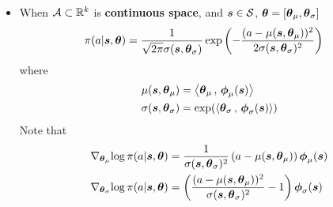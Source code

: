 \documentclass[11pt]{article}
\begin{document}
\begin{itemize}
\begin{itemize}
\begin{itemize}
\item When ${\mathcal A} \subset {\mathbb R}^{k}$ is \textbf{continuous space},  and $\boldsymbol{s} \in {\mathcal S}$, $\boldsymbol{\theta} = [\boldsymbol{\theta}_{\mu}, \boldsymbol{\theta}_{\sigma}]$
\begin{align}
\pi(a |\boldsymbol{s}, \boldsymbol{\theta}) &= \frac{1}{\sqrt{2\pi}\sigma(\boldsymbol{s}, \boldsymbol{\theta}_{\sigma})}\exp\left(-\frac{(a - \mu(\boldsymbol{s}, \boldsymbol{\theta}_{\mu}))^2}{2\sigma(\boldsymbol{s}, \boldsymbol{\theta}_{\sigma})^2}\right)
 \label{eqn: normal_policy}
\end{align} where 
\begin{align*}
\mu(\boldsymbol{s}, \boldsymbol{\theta}_{\mu}) &= \left\langle \boldsymbol{\theta}_{\mu}\,,\, \boldsymbol{\phi}_{\mu}(\boldsymbol{s}) \right\rangle \\
\sigma(\boldsymbol{s}, \boldsymbol{\theta}_{\sigma}) &= \exp(\left\langle \boldsymbol{\theta}_{\sigma}\,,\, \boldsymbol{\phi}_{\sigma}(\boldsymbol{s}) \right\rangle)
\end{align*} Note that
\begin{align*}
\nabla_{\boldsymbol{\theta}_{\mu}}{\log \pi(a |\boldsymbol{s}, \boldsymbol{\theta}) } &= \frac{1}{\sigma(\boldsymbol{s}, \boldsymbol{\theta}_{\sigma})^2}\left(a - \mu(\boldsymbol{s}, \boldsymbol{\theta}_{\mu})\right)\boldsymbol{\phi}_{\mu}(\boldsymbol{s}) \\
\nabla_{\boldsymbol{\theta}_{\sigma}}{\log \pi(a |\boldsymbol{s}, \boldsymbol{\theta}) }&= \left(\frac{(a - \mu(\boldsymbol{s}, \boldsymbol{\theta}_{\mu}))^2}{\sigma(\boldsymbol{s}, \boldsymbol{\theta}_{\sigma})^2} - 1\right)\boldsymbol{\phi}_{\sigma}(\boldsymbol{s})
\end{align*}
\end{itemize}

\end{itemize}

\end{itemize}
\end{document}

